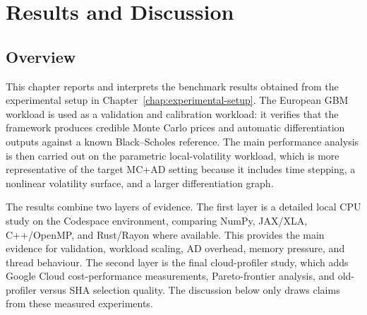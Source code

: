 \chapter{Results and Discussion}
\label{chap:results}

\section{Overview}
\label{sec:results-overview}

This chapter reports and interprets the benchmark results obtained from the
experimental setup in Chapter~\ref{chap:experimental-setup}.  The European
GBM workload is used as a validation and calibration workload: it verifies
that the framework produces credible Monte Carlo prices and automatic
differentiation outputs against a known Black--Scholes reference.  The main
performance analysis is then carried out on the parametric local-volatility
workload, which is more representative of the target MC+AD setting because
it includes time stepping, a nonlinear volatility surface, and a larger
differentiation graph.

The results combine two layers of evidence. The first layer is a detailed
local CPU study on the Codespace environment, comparing NumPy, JAX/XLA,
C++/OpenMP, and Rust/Rayon where available. This provides the main evidence
for validation, workload scaling, AD overhead, memory pressure, and thread
behaviour. The second layer is the final cloud-profiler study, which adds
Google Cloud cost-performance measurements, Pareto-frontier analysis, and
old-profiler versus SHA selection quality. The discussion below only draws
claims from these measured experiments.

